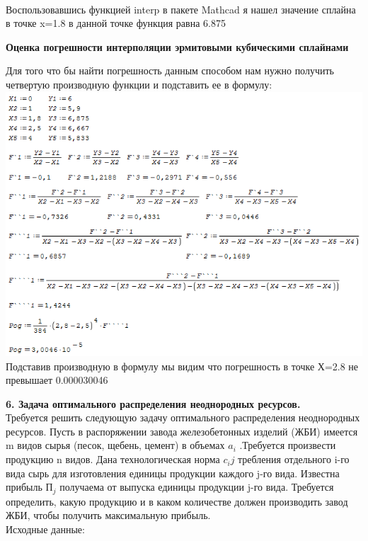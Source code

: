 \documentclass[russian,utf8,nocolumnxxxi,nocolumnxxxii]{eskdtext}
\begin{document}
\\Воспользовавшись функцией interp в пакете Mathcad я нашел значение сплайна в точке x=1.8 в данной точке функция равна 6.875
\newpage
\begin{center}

{\bf Оценка погрешности интерполяции эрмитовыми
кубическими сплайнами}

\end{center}
Для того что бы найти погрешность данным способом нам нужно получить четвертую производную функции и подставить ее в формулу:
\\\includegraphics[scale=1]{2}
\\Подставив производную в формулу мы видим что погрешность в точке Х=2.8 не превышает 0.000030046
\newpage 
\par 
\normalsize 
{\bf6. Задача оптимального распределения неоднородных ресурсов.}\\ 
Требуется решить следующую задачу оптимального распределения неоднородных ресурсов. Пусть в распоряжении завода железобетонных изделий (ЖБИ) имеется m видов сырья (песок, щебень, цемент) в объемах $ a_i$ .Требуется произвести продукцию n видов. Дана технологическая норма $c_ij$ требления отдельного i-го вида сырь для изготовления единицы продукции каждого j-го вида. Известна прибыль $П_j$ получаема от выпуска единицы продукции j-го вида. Требуется определить, какую продукцию и в каком количестве должен производить завод ЖБИ, чтобы получить максимальную прибыль.\\ 
Исходные данные:\\ 
\end{document}
